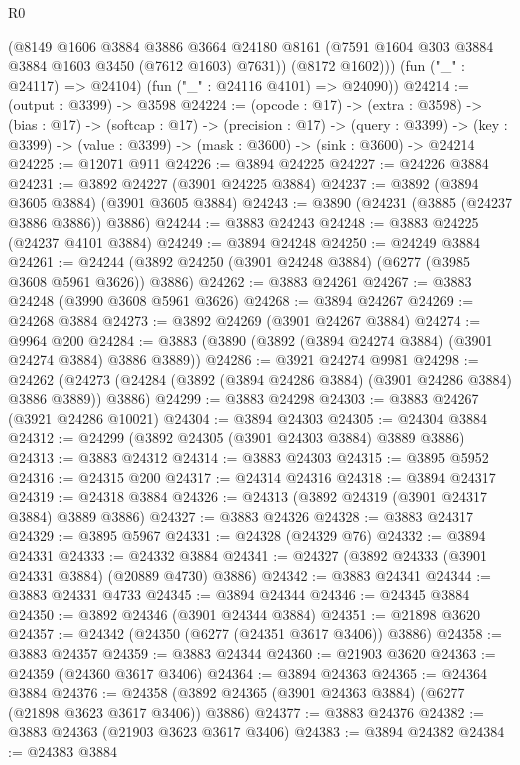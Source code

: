 \begin{lexlean}{R0}
\begin{coremodule}
          (@8149
            @1606
            @3884
            @3886
            @3664
            @24180
            @8161
            (@7591 @1604 @303 @3884 @3884 @1603 @3450 (@7612 @1603) @7631))
          (@8172 @1602)))
      (fun ("_" : @24117) => @24104)
      (fun ("_" : @24116 @4101) => @24090))
@24214 := (output : @3399) -> @3598
@24224 := (opcode : @17) ->
  (extra : @3598) ->
  (bias : @17) ->
  (softcap : @17) ->
  (precision : @17) ->
  (query : @3399) -> (key : @3399) -> (value : @3399) -> (mask : @3600) -> (sink : @3600) -> @24214
@24225 := @12071 @911
@24226 := @3894 @24225
@24227 := @24226 @3884
@24231 := @3892 @24227 (@3901 @24225 @3884)
@24237 := @3892 (@3894 @3605 @3884) (@3901 @3605 @3884)
@24243 := @3890 (@24231 (@3885 (@24237 @3886 @3886)) @3886)
@24244 := @3883 @24243
@24248 := @3883 @24225 (@24237 @4101 @3884)
@24249 := @3894 @24248
@24250 := @24249 @3884
@24261 := @24244 (@3892 @24250 (@3901 @24248 @3884) (@6277 (@3985 @3608 @5961 @3626)) @3886)
@24262 := @3883 @24261
@24267 := @3883 @24248 (@3990 @3608 @5961 @3626)
@24268 := @3894 @24267
@24269 := @24268 @3884
@24273 := @3892 @24269 (@3901 @24267 @3884)
@24274 := @9964 @200
@24284 := @3883 (@3890 (@3892 (@3894 @24274 @3884) (@3901 @24274 @3884) @3886 @3889))
@24286 := @3921 @24274 @9981
@24298 := @24262
    (@24273 (@24284 (@3892 (@3894 @24286 @3884) (@3901 @24286 @3884) @3886 @3889)) @3886)
@24299 := @3883 @24298
@24303 := @3883 @24267 (@3921 @24286 @10021)
@24304 := @3894 @24303
@24305 := @24304 @3884
@24312 := @24299 (@3892 @24305 (@3901 @24303 @3884) @3889 @3886)
@24313 := @3883 @24312
@24314 := @3883 @24303
@24315 := @3895 @5952
@24316 := @24315 @200
@24317 := @24314 @24316
@24318 := @3894 @24317
@24319 := @24318 @3884
@24326 := @24313 (@3892 @24319 (@3901 @24317 @3884) @3889 @3886)
@24327 := @3883 @24326
@24328 := @3883 @24317
@24329 := @3895 @5967
@24331 := @24328 (@24329 @76)
@24332 := @3894 @24331
@24333 := @24332 @3884
@24341 := @24327 (@3892 @24333 (@3901 @24331 @3884) (@20889 @4730) @3886)
@24342 := @3883 @24341
@24344 := @3883 @24331 @4733
@24345 := @3894 @24344
@24346 := @24345 @3884
@24350 := @3892 @24346 (@3901 @24344 @3884)
@24351 := @21898 @3620
@24357 := @24342 (@24350 (@6277 (@24351 @3617 @3406)) @3886)
@24358 := @3883 @24357
@24359 := @3883 @24344
@24360 := @21903 @3620
@24363 := @24359 (@24360 @3617 @3406)
@24364 := @3894 @24363
@24365 := @24364 @3884
@24376 := @24358 (@3892 @24365 (@3901 @24363 @3884) (@6277 (@21898 @3623 @3617 @3406)) @3886)
@24377 := @3883 @24376
@24382 := @3883 @24363 (@21903 @3623 @3617 @3406)
@24383 := @3894 @24382
@24384 := @24383 @3884

\end{coremodule}
\end{lexlean}
